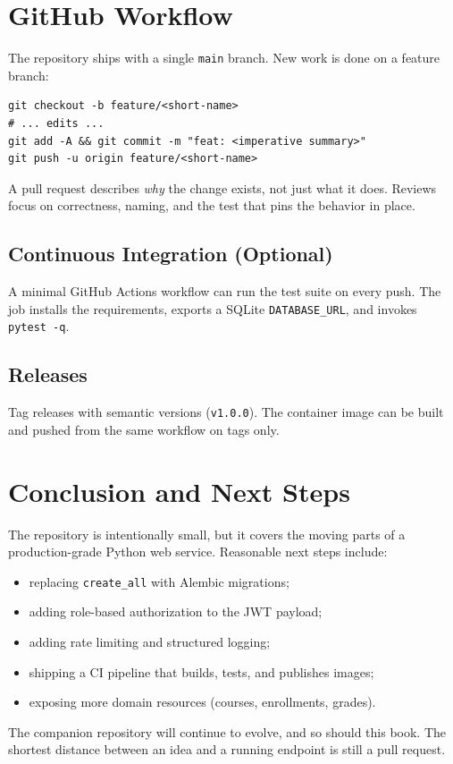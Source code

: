 \documentclass[11pt]{book}
\begin{document}
\chapter{GitHub Workflow}
\label{ch:github}

The repository ships with a single \texttt{main} branch. New work is
done on a feature branch:
\begin{lstlisting}[style=base]
git checkout -b feature/<short-name>
# ... edits ...
git add -A && git commit -m "feat: <imperative summary>"
git push -u origin feature/<short-name>
\end{lstlisting}
A pull request describes \emph{why} the change exists, not just what it
does. Reviews focus on correctness, naming, and the test that pins the
behavior in place.

\section{Continuous Integration (Optional)}
A minimal GitHub Actions workflow can run the test suite on every push.
The job installs the requirements, exports a SQLite \texttt{DATABASE\_URL},
and invokes \texttt{pytest -q}.

\section{Releases}
Tag releases with semantic versions (\texttt{v1.0.0}). The container image
can be built and pushed from the same workflow on tags only.

\chapter{Conclusion and Next Steps}
\label{ch:next}

The repository is intentionally small, but it covers the moving parts of
a production-grade Python web service. Reasonable next steps include:
\begin{itemize}[leftmargin=*]
  \item replacing \texttt{create\_all} with Alembic migrations;
  \item adding role-based authorization to the JWT payload;
  \item adding rate limiting and structured logging;
  \item shipping a CI pipeline that builds, tests, and publishes images;
  \item exposing more domain resources (courses, enrollments, grades).
\end{itemize}

The companion repository will continue to evolve, and so should this
book. The shortest distance between an idea and a running endpoint is
still a pull request.

\backmatter
\end{document}
